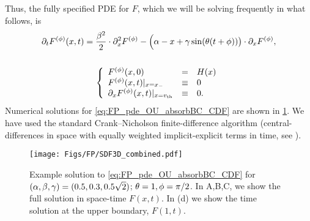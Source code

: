Thus, the fully specified PDE for $F$, which we will be solving frequently in what
follows, is
\begin{equation}
\begin{gathered}
	{\partial}_t F^{(\phi)}(x,t) =
					\frac{\beta^2 }{2}\cdot {\partial}^2_x F^{(\phi)} -  
					\Big(\alpha- x + {\gamma } \sin({ \theta} (t + \phi))\big)  \cdot {\partial}_x F^{(\phi)},
	\\
	\\
	\left\{ \begin{array}{lcl}
	 F^{(\phi)}(x,0) &=& H(x)
	\\
	F^{(\phi)}(x,t) |_{x={ x_{-} }} &\equiv& 0 
	\\
	{\partial}_x F^{(\phi)}(x,t) |_{x={ v_{\textrm{th} } }} &\equiv& 0.
	\end{array} \right.
\label{eq:FP_pde_OU_absorbBC_CDF}
\end{gathered}
\end{equation}
Numerical solutions for \cref{eq:FP_pde_OU_absorbBC_CDF} are shown in
\cref{fig:FP_pde_OU_absorbBC_CDF}. We have used the standard Crank--Nicholson
finite-difference algorithm (central-differences in space with equally weighted
implicit-explicit terms in time, see \cite{Karniadakis2003}). 

\begin{figure}[h]
\begin{center}
\texttt{[image: Figs/FP/SDF3D\_combined.pdf]} 
\caption[Transition distribution example solution]{Example solution to
\cref{eq:FP_pde_OU_absorbBC_CDF} for $(\alpha,\beta,{\gamma }) = (0.5, 0.3, 0.5\sqrt{2})$; ${ \theta}= 1, \phi = \pi / 2$.
In A,B,C, we show the full solution in space-time $F(x,t)$. In (d) we show
the time solution at the upper boundary, $F(1,t)$.} 
\label{fig:FP_pde_OU_absorbBC_CDF} 
\end{center}
\end{figure}

